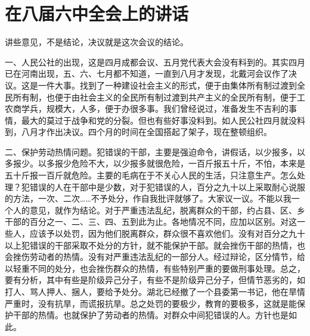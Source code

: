 \section[在八届六中全会上的讲话（一九五八年十二月九日）]{在八届六中全会上的讲话}


讲些意见，不是结论，决议就是这次会议的结论。

一、人民公社的出现，这是四月成都会议、五月党代表大会没有料到的。其实四月已在河南出现，五、六、七月都不知道，一直到八月才发现，北戴河会议作了决议。这是一件大事。找到了一种建设社会主义的形式，便于由集体所有制过渡到全民所有制，也便于由社会主义的全民所有制过渡到共产主义的全民所有制，便于工农商学兵，规模大，人多，便于办很多事。我们曾经说过，准备发生不吉利的事情，最大的莫过于战争和党的分裂。但也有些好事没料到。如人民公社四月就没料到，八月才作出决议。四个月的时间在全国搭起了架子，现在整顿组织。

二、保护劳动热情问题。犯错误的干部，主要是强迫命令，讲假话，以少报多，以多报少。以多报少危险不大，以少报多就很危险，一百斤报五十斤，不怕，本来是五十斤报一百斤就危险。主要的毛病在于不关心人民的生活，只注意生产。怎么处理？犯错误的人在干部中是少数，对于犯错误的人，百分之九十以上采取耐心说服的方法，一次、二次……不予处分，作自我批评就够了。大家议一议。不能以我一个人的意见，就作为结论。对于严重违法乱纪，脱离群众的干部，约占县、区、乡干部的百分之一、二、三、四、五到此为止。各地情况不同，应加以区别。对这一些人，应该予以处罚，因为他们脱离群众，群众很不喜欢他们。没有对百分之九十以上犯错误的干部采取不处分的方针，就不能保护干部。就会挫伤干部的热情，也会挫伤劳动者的热情。没有对严重违法乱纪的一部分人。经过辩论，区分情节，给以轻重不同的处分，也会挫伤群众的热情，有些特别严重的要做刑事处理。总之，要有分析，其中有些是阶级异己分子，有些不是阶级异己分子，但情节恶劣的，如打人、骂人押人、捆人，要给予处分。湖北已经撤了一个县委第一书记，他在旱情严重时，没有抗旱，而谎报抗旱。总之处罚的要极少，教育的要极多，这就是能保护干部的热情。也就保护了劳动者的热情。对群众中间犯错误的人。方针也是如此。

